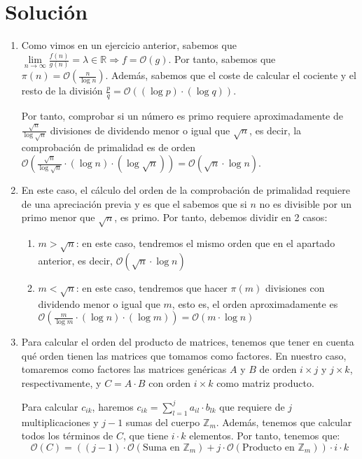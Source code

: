 \section*{Solución}
	\begin{enumerate}
		\item Como vimos en un ejercicio anterior, sabemos que $\lim\limits_{n \rightarrow \infty} \frac{f(n)}
		{g(n)} = \lambda \in \mathbb{R} \Rightarrow f = \mathcal{O}(g)$. Por tanto, sabemos que $\pi (n) =
		\mathcal{O}\left(\frac{n}{\log n}\right)$. Además, sabemos que el coste de calcular el cociente y el
		resto de la división $\frac{p}{q} = \mathcal{O}((\log p) \cdot (\log q))$.
		
		Por tanto, comprobar si un número es primo requiere aproximadamente de $\frac{\sqrt{n}}{\log \sqrt{n}}$
		divisiones de dividendo menor o igual que $\sqrt{n}$, es decir, la comprobación de primalidad es de orden
		$\mathcal{O}\left(\frac{\sqrt{n}}{\log \sqrt{n}} \cdot (\log n) \cdot \left(\log \sqrt{n}\right)\right)
		= \mathcal{O} \left(\sqrt{n} \cdot \log n\right)$.
		
		\item En este caso, el cálculo del orden de la comprobación de primalidad requiere de una apreciación
		previa y es que el sabemos que si $n$ no es divisible por un primo menor que $\sqrt{n}$, es primo.
		Por tanto, debemos dividir en 2 casos:
		\begin{enumerate}
			\item $m > \sqrt{n}$: en este caso, tendremos el mismo orden que en el apartado anterior, es decir,
			$\mathcal{O} \left(\sqrt{n} \cdot \log n\right)$
			\item $m < \sqrt{n}$: en este caso, tendremos que hacer $\pi (m)$ divisiones con dividendo menor o
			igual que $m$, esto es, el orden aproximadamente es $\mathcal{O}\left(\frac{m}{\log m} \cdot
			(\log n) \cdot (\log m)\right) = \mathcal{O} \left(m \cdot \log n\right)$
		\end{enumerate}
		
		\item Para calcular el orden del producto de matrices, tenemos que tener en cuenta qué orden tienen
		las matrices que tomamos como factores. En nuestro caso, tomaremos como factores las matrices genéricas
		$A$ y $B$ de orden $i \times j$ y $j \times k$, respectivamente, y $C = A \cdot B$ con orden $i \times k$
		como matriz producto.
		
		Para calcular $c_{ik}$, haremos $\displaystyle c_{ik} = \sum_{l=1}^{j} a_{il} \cdot b_{lk}$ que requiere
		de $j$ multiplicaciones y $j-1$ sumas del cuerpo $\mathbb{Z}_m$. Además, tenemos que calcular todos los
		términos de $C$, que tiene $i \cdot k$ elementos. Por tanto, tenemos que:
		$$\mathcal{O}(C) = \left((j-1) \cdot \mathcal{O}(\text{Suma en }\mathbb{Z}_m) +j \cdot
		\mathcal{O}(\text{Producto en } \mathbb{Z}_m)\right) \cdot i \cdot k$$
		

\end{enumerate}
